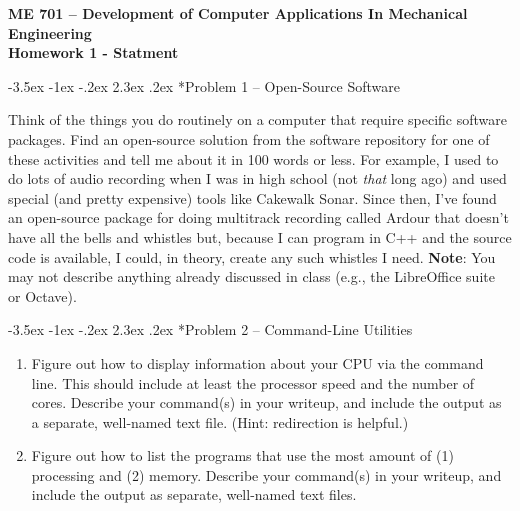\documentclass[11pt]{article}
\makeatletter
\renewcommand\section{\@startsection{section}{1}{\z@}%
                                  {-3.5ex \@plus -1ex \@minus -.2ex}%
                                  {2.3ex \@plus.2ex}%
                                  {\normalfont\bfseries}}
\makeatother
\begin{document}
{\large
  \begin{center}
    {\bf ME 701 -- Development of Computer Applications In Mechanical Engineering \\ 
         Homework 1 - Statment}
  \end{center}
}
 

\section*{Problem 1 -- Open-Source Software}

Think of the things you do routinely on a computer that require 
specific software packages.  Find an 
open-source solution from the software repository  
for one of these activities and tell me about it in 100 words or less.
For example, I used to do lots of audio recording when I was in 
high school (not {\it that} long ago) and used special (and 
pretty expensive) tools like 
Cakewalk Sonar.  Since then, I've found an 
open-source package for doing multitrack 
recording called Ardour that doesn't have all the bells and 
whistles but, because I can program in C++ and the 
source code is available, I could, in theory,
create any such whistles I need.  {\bf Note}: You may not
describe anything already discussed in class (e.g., the LibreOffice suite
or Octave).


\section*{Problem 2 -- Command-Line Utilities}

\begin{enumerate}
\item Figure out how to display information about your CPU via the 
      command line.  This should include at least the processor 
      speed and the number of cores.  Describe your command(s) in your
      writeup, and include the output as a separate, well-named text file.
      (Hint: redirection is helpful.)
\item Figure out how to list the programs that use the most 
      amount of (1) processing and (2) memory.  Describe your command(s) 
      in your writeup, and include the output as separate,
      well-named text files. 
\end{enumerate}

 
\end{document}
